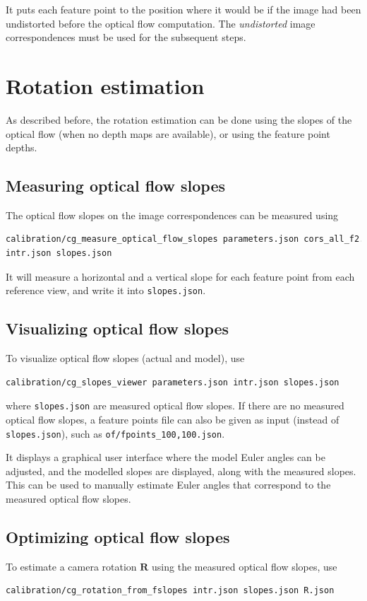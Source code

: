 \documentclass[11pt]{scrreprt}
\newcommand{\matr}[1]{\mathbf{#1}}
\begin{document}
\noindent It puts each feature point to the position where it would be if the image had been undistorted before the optical flow computation. The \emph{undistorted} image correspondences must be used for the subsequent steps.


\section{Rotation estimation}
As described before, the rotation estimation can be done using the slopes of the optical flow (when no depth maps are available), or using the feature point depths.


\subsection{Measuring optical flow slopes}
The optical flow slopes on the image correspondences can be measured using
\begin{lstlisting}[language=bash]
calibration/cg_measure_optical_flow_slopes parameters.json cors_all_f2.bin
intr.json slopes.json
\end{lstlisting}

\noindent It will measure a horizontal and a vertical slope for each feature point from each reference view, and write it into \texttt{slopes.json}.


\subsection{Visualizing optical flow slopes}
To visualize optical flow slopes (actual and model), use
\begin{lstlisting}[language=bash]
calibration/cg_slopes_viewer parameters.json intr.json slopes.json
\end{lstlisting}
where \texttt{slopes.json} are measured optical flow slopes. If there are no measured optical flow slopes, a feature points file can also be given as input (instead of \texttt{slopes.json}), such as \texttt{of/fpoints\_100,100.json}.

It displays a graphical user interface where the model Euler angles can be adjusted, and the modelled slopes are displayed, along with the measured slopes. This can be used to manually estimate Euler angles that correspond to the measured optical flow slopes.


\subsection{Optimizing optical flow slopes}
To estimate a camera rotation $\matr{R}$ using the measured optical flow slopes, use
\begin{lstlisting}[language=bash]
calibration/cg_rotation_from_fslopes intr.json slopes.json R.json
\end{lstlisting}
\end{document}
